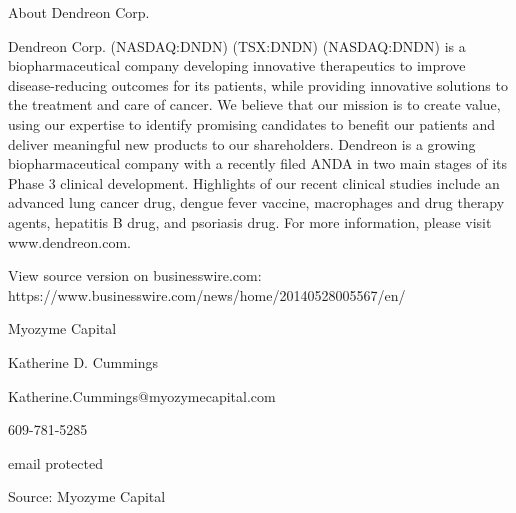 \documentclass{article}
\begin{document}
About Dendreon Corp.

Dendreon Corp. (NASDAQ:DNDN) (TSX:DNDN) (NASDAQ:DNDN) is a biopharmaceutical company developing innovative therapeutics to improve disease-reducing outcomes for its patients, while providing innovative solutions to the treatment and care of cancer. We believe that our mission is to create value, using our expertise to identify promising candidates to benefit our patients and deliver meaningful new products to our shareholders. Dendreon is a growing biopharmaceutical company with a recently filed ANDA in two main stages of its Phase 3 clinical development. Highlights of our recent clinical studies include an advanced lung cancer drug, dengue fever vaccine, macrophages and drug therapy agents, hepatitis B drug, and psoriasis drug. For more information, please visit www.dendreon.com.

View source version on businesswire.com: https://www.businesswire.com/news/home/20140528005567/en/

Myozyme Capital

Katherine D. Cummings

Katherine.Cummings@myozymecapital.com

609-781-5285

email protected

Source: Myozyme Capital
\end{document}
